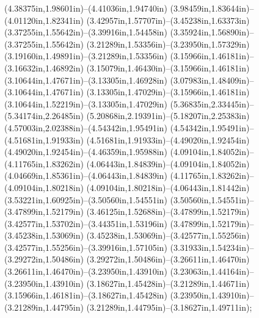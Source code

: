 (4.38375in,1.98601in)--(4.41036in,1.94740in) (3.98459in,1.83644in)--(4.01120in,1.82341in) (3.42957in,1.57707in)--(3.45238in,1.63373in) (3.37255in,1.55642in)--(3.39916in,1.54458in) (3.35924in,1.56890in)--(3.37255in,1.55642in) (3.21289in,1.53356in)--(3.23950in,1.57329in) (3.19160in,1.49891in)--(3.21289in,1.53356in) (3.15966in,1.46181in)--(3.16632in,1.46892in) (3.15079in,1.46430in)--(3.15966in,1.46181in) (3.10644in,1.47671in)--(3.13305in,1.46928in) (3.07983in,1.48409in)--(3.10644in,1.47671in) (3.13305in,1.47029in)--(3.15966in,1.46181in) (3.10644in,1.52219in)--(3.13305in,1.47029in) (5.36835in,2.33445in)--(5.34174in,2.26485in) (5.20868in,2.19391in)--(5.18207in,2.25383in) (4.57003in,2.02388in)--(4.54342in,1.95491in) (4.54342in,1.95491in)--(4.51681in,1.91933in) (4.51681in,1.91933in)--(4.49020in,1.92454in) (4.49020in,1.92454in)--(4.46359in,1.95988in) (4.09104in,1.84052in)--(4.11765in,1.83262in) (4.06443in,1.84839in)--(4.09104in,1.84052in) (4.04669in,1.85361in)--(4.06443in,1.84839in) (4.11765in,1.83262in)--(4.09104in,1.80218in) (4.09104in,1.80218in)--(4.06443in,1.81442in) (3.53221in,1.60925in)--(3.50560in,1.54551in) (3.50560in,1.54551in)--(3.47899in,1.52179in) (3.46125in,1.52688in)--(3.47899in,1.52179in) (3.42577in,1.53702in)--(3.44351in,1.53196in) (3.47899in,1.52179in)--(3.45238in,1.53069in) (3.45238in,1.53069in)--(3.42577in,1.55256in) (3.42577in,1.55256in)--(3.39916in,1.57105in) (3.31933in,1.54234in)--(3.29272in,1.50486in) (3.29272in,1.50486in)--(3.26611in,1.46470in) (3.26611in,1.46470in)--(3.23950in,1.43910in) (3.23063in,1.44164in)--(3.23950in,1.43910in) (3.18627in,1.45428in)--(3.21289in,1.44671in) (3.15966in,1.46181in)--(3.18627in,1.45428in) (3.23950in,1.43910in)--(3.21289in,1.44795in) (3.21289in,1.44795in)--(3.18627in,1.49711in);
